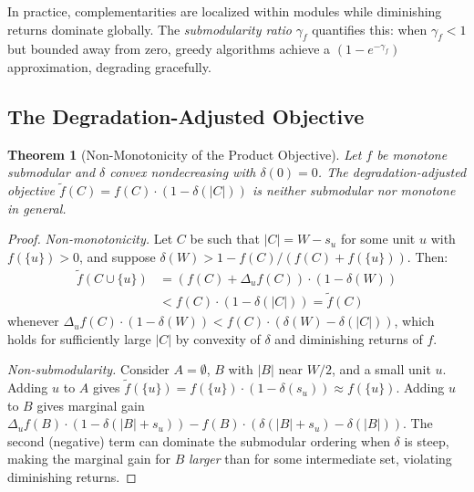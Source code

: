 \documentclass[11pt, a4paper, copyright]{googledeepmind}
\newtheorem{theorem}{Theorem}[section]
\begin{document}
In practice, complementarities are localized within modules while diminishing returns dominate globally. The \emph{submodularity ratio} $\gamma_f$ \citep{das2011submodular} quantifies this: when $\gamma_f < 1$ but bounded away from zero, greedy algorithms achieve a $(1 - e^{-\gamma_f})$ approximation, degrading gracefully.

\subsection{The Degradation-Adjusted Objective}

\begin{theorem}[Non-Monotonicity of the Product Objective]
\label{thm:nonmonotone}
Let $f$ be monotone submodular and $\delta$ convex nondecreasing with $\delta(0) = 0$. The degradation-adjusted objective $\tilde{f}(C) = f(C) \cdot (1 - \delta(|C|))$ is neither submodular nor monotone in general.
\end{theorem}

\begin{proof}
\emph{Non-monotonicity.} Let $C$ be such that $|C| = W - s_u$ for some unit $u$ with $f(\{u\}) > 0$, and suppose $\delta(W) > 1 - f(C)/(f(C) + f(\{u\}))$. Then:
\begin{align*}
\tilde{f}(C \cup \{u\}) &= (f(C) + \Delta_u f(C)) \cdot (1 - \delta(W)) \\
&< f(C) \cdot (1 - \delta(|C|)) = \tilde{f}(C)
\end{align*}
whenever $\Delta_u f(C) \cdot (1 - \delta(W)) < f(C) \cdot (\delta(W) - \delta(|C|))$, which holds for sufficiently large $|C|$ by convexity of $\delta$ and diminishing returns of $f$.

\emph{Non-submodularity.} Consider $A = \emptyset$, $B$ with $|B|$ near $W/2$, and a small unit $u$. Adding $u$ to $A$ gives $\tilde{f}(\{u\}) = f(\{u\}) \cdot (1 - \delta(s_u)) \approx f(\{u\})$. Adding $u$ to $B$ gives marginal gain $\Delta_u f(B) \cdot (1 - \delta(|B| + s_u)) - f(B) \cdot (\delta(|B|+s_u) - \delta(|B|))$. The second (negative) term can dominate the submodular ordering when $\delta$ is steep, making the marginal gain for $B$ \emph{larger} than for some intermediate set, violating diminishing returns.
\end{proof}
\end{document}

